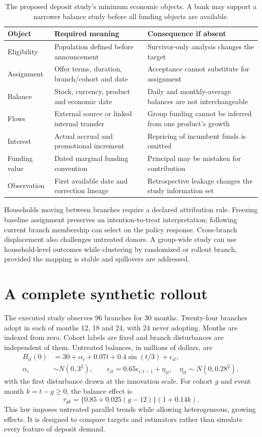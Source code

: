 \begin{table}[htbp]\centering\small
\begin{tabularx}{\textwidth}{P{31mm}XX}
\toprule Object & Required meaning & Consequence if absent\\\midrule
Eligibility & Population defined before announcement & Survivor-only analysis changes the target\\
Assignment & Offer terms, duration, branch/cohort and date & Acceptance cannot substitute for assignment\\
Balance & Stock, currency, product and economic date & Daily and monthly-average balances are not interchangeable\\
Flows & External source or linked internal transfer & Group funding cannot be inferred from one product's growth\\
Interest & Actual accrual and promotional increment & Repricing of incumbent funds is omitted\\
Funding value & Dated marginal funding convention & Principal may be mistaken for contribution\\
Observation & First available date and correction lineage & Retrospective leakage changes the study information set\\
\bottomrule
\end{tabularx}
\caption{The proposed deposit study's minimum economic objects. A bank may
support a narrower balance study before all funding objects are available.}
\end{table}

Households moving between branches require a declared attribution rule.
Freezing baseline assignment preserves an intention-to-treat interpretation;
following current branch membership can select on the policy response.
Cross-branch displacement also challenges untreated donors. A group-wide
study can use household-level outcomes while clustering by randomized or
rollout branch, provided the mapping is stable and spillovers are addressed.

\section{A complete synthetic rollout}
The executed study observes 96 branches for 30 months. Twenty-four branches
adopt in each of months 12, 18 and 24, with 24 never adopting. Months are
indexed from zero. Cohort labels are fixed and branch disturbances are
independent of them. Untreated balances, in millions of dollars, are
\begin{align}
 B_{it}(0)&=30+\alpha_i+0.07t+0.4\sin(t/3)+\epsilon_{it},\\
 \alpha_i&\sim N(0,3^2),\qquad
 \epsilon_{it}=0.65\epsilon_{i,t-1}+\eta_{it},\quad
 \eta_{it}\sim N(0,0.28^2),
 \label{eq:deposit-dgp}
\end{align}
with the first disturbance drawn at the innovation scale. For cohort $g$
and event month $k=t-g\geq0$, the balance effect is
\[
 \tau_{gk}=\{0.85+0.025(g-12)\}(1+0.14k).
\]
This law imposes untreated parallel trends while allowing heterogeneous,
growing effects. It is designed to compare targets and estimators rather
than simulate every feature of deposit demand.

